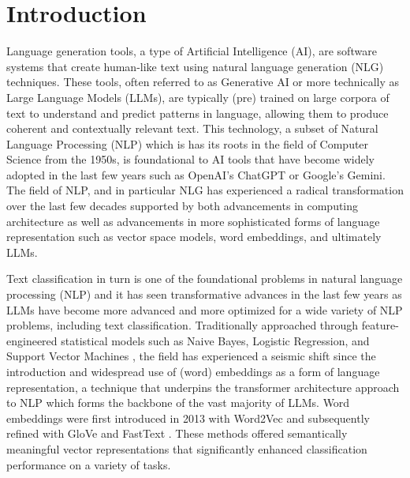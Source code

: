 \documentclass[final]{clv2025}
\begin{document}
\begin{abstract}
language models (i.e. 'static' word embeddings) and a 12.73\% on average Macro-F1 score improvement over classical ML approaches. However, our results show that this performance improvement comes at a great computational cost, some 4398.07$\%$ increase in GPU computation requirements over the static embedding DL approaches (which also leverage GPUs but are not content-aware) and 4126.02$\%$ more computational time for the classical ML classifier training (which are CPU bound). In short, the analysis we provide here should give pause to researchers and practitioners alike to make sure that the performance gains that get from using LLMs are in fact worth the additional time and cost required to achieve said gains.
\end{abstract}

\section{Introduction}

Language generation tools, a type of Artificial Intelligence (AI), are software systems that create human-like text using natural language generation (NLG) techniques. These tools, often referred to as Generative AI or more technically as Large Language Models (LLMs), are typically (pre) trained on large corpora of text to understand and predict patterns in language, allowing them to produce coherent and contextually relevant text. This technology, a subset of Natural Language Processing (NLP) which is has its roots in the field of Computer Science from the 1950s, is foundational to AI tools that have become widely adopted in the last few years such as OpenAI's ChatGPT or Google's Gemini. The field of NLP, and in particular NLG has   experienced a radical transformation over the last few decades supported by both advancements in computing architecture as well as advancements in more sophisticated forms of language representation such as vector space models, word embeddings, and ultimately LLMs. 

Text classification in turn is one of the foundational problems in natural language processing (NLP) and it has seen transformative advances in the last few years as LLMs have become more advanced and more optimized for a wide variety of NLP problems, including text classification. Traditionally approached through feature-engineered statistical models such as Naive Bayes, Logistic Regression, and Support Vector Machines \cite{joachims1998text}, the field has experienced a seismic shift since the introduction and widespread use of (word) embeddings as a form of language representation, a technique that underpins the transformer architecture approach to NLP which forms the backbone of the vast majority of LLMs. Word embeddings were first introduced in 2013 with Word2Vec \cite{mikolov} and subsequently refined with GloVe \cite{pennington} and FastText \cite{articleboja}. These methods offered semantically meaningful vector representations that significantly enhanced classification performance on a variety of tasks.
\end{document}
